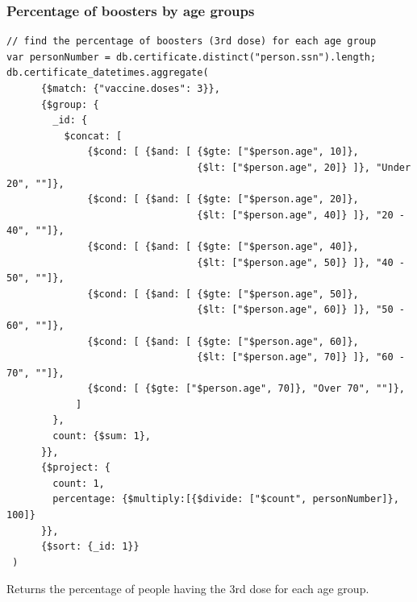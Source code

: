 \documentclass[12pt, a4paper]{article}
\begin{document}
\subsubsection{Percentage of boosters by age groups}
\begin{tcolorbox}[fontupper=\scriptsize]
    \begin{verbatim}
// find the percentage of boosters (3rd dose) for each age group
var personNumber = db.certificate.distinct("person.ssn").length;
db.certificate_datetimes.aggregate(
      {$match: {"vaccine.doses": 3}},
      {$group: {
        _id: {
          $concat: [
              {$cond: [ {$and: [ {$gte: ["$person.age", 10]},
                                 {$lt: ["$person.age", 20]} ]}, "Under 20", ""]},
              {$cond: [ {$and: [ {$gte: ["$person.age", 20]}, 
                                 {$lt: ["$person.age", 40]} ]}, "20 - 40", ""]},
              {$cond: [ {$and: [ {$gte: ["$person.age", 40]}, 
                                 {$lt: ["$person.age", 50]} ]}, "40 - 50", ""]},
              {$cond: [ {$and: [ {$gte: ["$person.age", 50]}, 
                                 {$lt: ["$person.age", 60]} ]}, "50 - 60", ""]},
              {$cond: [ {$and: [ {$gte: ["$person.age", 60]}, 
                                 {$lt: ["$person.age", 70]} ]}, "60 - 70", ""]},
              {$cond: [ {$gte: ["$person.age", 70]}, "Over 70", ""]},
            ]
        },
        count: {$sum: 1},
      }},
      {$project: {
        count: 1,
        percentage: {$multiply:[{$divide: ["$count", personNumber]}, 100]}
      }},
      {$sort: {_id: 1}}
 )
    \end{verbatim}
\end{tcolorbox}
\noindent 
Returns the percentage of people having the 3rd dose for each age group.
\end{document}

